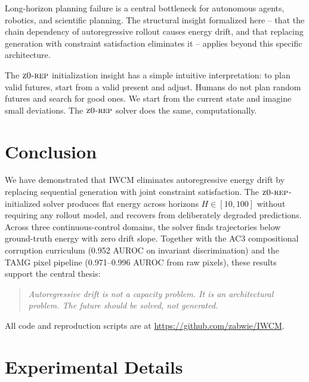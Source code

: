 \documentclass[12pt]{article}
\newcommand{\zrep}{\textsc{z0-rep}}
\begin{document}
Long-horizon planning failure is a central bottleneck for autonomous agents, robotics, and scientific planning. The structural insight formalized here -- that the chain dependency of autoregressive rollout causes energy drift, and that replacing generation with constraint satisfaction eliminates it -- applies beyond this specific architecture.

The $\zrep$ initialization insight has a simple intuitive interpretation: to plan valid futures, start from a valid present and adjust. Humans do not plan random futures and search for good ones. We start from the current state and imagine small deviations. The $\zrep$ solver does the same, computationally.

\section{Conclusion}
\label{sec:conclusion}

We have demonstrated that IWCM eliminates autoregressive energy drift by replacing sequential generation with joint constraint satisfaction. The $\zrep$-initialized solver produces flat energy across horizons $H \in [10, 100]$ without requiring any rollout model, and recovers from deliberately degraded predictions. Across three continuous-control domains, the solver finds trajectories below ground-truth energy with zero drift slope. Together with the AC3 compositional corruption curriculum (0.952 AUROC on invariant discrimination) and the TAMG pixel pipeline (0.971--0.996 AUROC from raw pixels), these results support the central thesis:

\begin{quote}
\textit{Autoregressive drift is not a capacity problem. It is an architectural problem. The future should be solved, not generated.}
\end{quote}

All code and reproduction scripts are at \url{https://github.com/zabwie/IWCM}.




\appendix

\section{Experimental Details}
\label{app:experiments}
\end{document}
